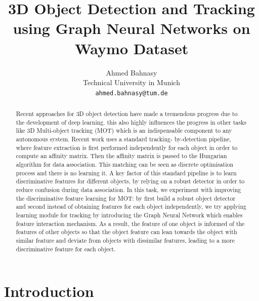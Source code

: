 \documentclass[10pt,twocolumn,letterpaper]{article}
\begin{document}
\title{3D Object Detection and Tracking using Graph Neural Networks on Waymo Dataset}

\author{Ahmed Bahnasy\\
Technical University in Munich\\

{\tt\small ahmed.bahnasy@tum.de}
}

\maketitle

\begin{abstract}
Recent approaches for 3D object detection have made a tremendous progress due to the development of deep learning. this also highly influences the  progress in other tasks like 3D Multi-object tracking (MOT) which is an indispensable component to any autonomous system. Recent work uses a standard tracking- by-detection pipeline, where feature extraction is first performed independently for each object in order to compute an affinity matrix. Then the affinity matrix is passed to the Hungarian algorithm for data association. This matching can be seen as discrete optimisation process and there is no learning it. A key factor of this standard pipeline is to learn discriminative features for different objects, by relying on a robust detector in order to reduce confusion during data association. In this task, we experiment with improving the discriminative feature learning for MOT: by first build a robust object detector and second instead of obtaining features for each object independently, we try applying learning module for tracking by introducing the Graph Neural Network which enables feature interaction mechanism. As a result, the feature of one object is informed of the features of other objects so that the object feature can lean towards the object with similar feature  and deviate from objects with dissimilar features, leading to a more discriminative feature for each object.
\end{abstract}

\section{Introduction}\label{sec:intro}
\end{document}
